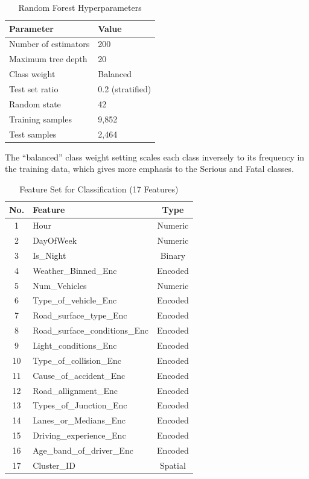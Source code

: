 \documentclass[conference]{IEEEtran}
\begin{document}
\begin{table}[htbp]
\caption{Random Forest Hyperparameters}
\begin{center}
\begin{tabular}{ll}
\toprule
\textbf{Parameter} & \textbf{Value} \\
\midrule
Number of estimators & 200 \\
Maximum tree depth & 20 \\
Class weight & Balanced \\
Test set ratio & 0.2 (stratified) \\
Random state & 42 \\
Training samples & 9,852 \\
Test samples & 2,464 \\
\bottomrule
\end{tabular}
\label{tab:rf_params}
\end{center}
\end{table}

The ``balanced'' class weight setting scales each class inversely to its frequency in the training data, which gives more emphasis to the Serious and Fatal classes.

\begin{table}[htbp]
\caption{Feature Set for Classification (17 Features)}
\begin{center}
\footnotesize
\begin{tabular}{clc}
\toprule
\textbf{No.} & \textbf{Feature} & \textbf{Type} \\
\midrule
1 & Hour & Numeric \\
2 & DayOfWeek & Numeric \\
3 & Is\_Night & Binary \\
4 & Weather\_Binned\_Enc & Encoded \\
5 & Num\_Vehicles & Numeric \\
6 & Type\_of\_vehicle\_Enc & Encoded \\
7 & Road\_surface\_type\_Enc & Encoded \\
8 & Road\_surface\_conditions\_Enc & Encoded \\
9 & Light\_conditions\_Enc & Encoded \\
10 & Type\_of\_collision\_Enc & Encoded \\
11 & Cause\_of\_accident\_Enc & Encoded \\
12 & Road\_allignment\_Enc & Encoded \\
13 & Types\_of\_Junction\_Enc & Encoded \\
14 & Lanes\_or\_Medians\_Enc & Encoded \\
15 & Driving\_experience\_Enc & Encoded \\
16 & Age\_band\_of\_driver\_Enc & Encoded \\
17 & Cluster\_ID & Spatial \\
\bottomrule
\end{tabular}
\label{tab:features}
\end{center}
\end{table}
\end{document}
